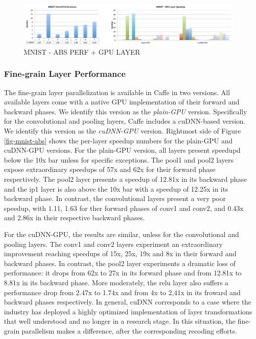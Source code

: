 
\begin{figure}[]
\includegraphics[width=\textwidth]{figures/mnist-abs-perf+gpu-layer.pdf}
\caption{MNIST - ABS PERF + GPU LAYER }
\end{figure}

\subsubsection{Fine-grain Layer Performance}
The fine-grain layer parallelization is available in Caffe in two versions. 
All available layers come with a native GPU implementation of their 
forward and backward phases. We identify this version as the \emph{plain-GPU} 
version. Specifically for the convolutional and pooling layers, Caffe 
includes a cuDNN-based version. We identify this version as the 
\emph{cuDNN-GPU} version. 
Rightmost side of Figure \ref{fig-mnist-abs} shows the per-layer 
speedup numbers for the plain-GPU and cuDNN-GPU versions. 
For the plain-GPU version, all layers present speedupd below 
the 10x bar unless for specific exceptions. The pool1 and pool2 
layers expose extraordinary speedups of 57x and 62x for their 
forward phase respectively. The pool2 layer presents a speedup of 
12.81x in its backward phase and the ip1 layer is also above the 
10x bar with a speedup of 12.25x in its backward phase.
In contrast, the convolutional layers present a very poor speedup, with 
1.11, 1.63 for ther forward phases of conv1 and conv2, and 0.43x and 2.86x 
in their respective backward phases. 

For the cuDNN-GPU, the results are similar, unless for the convolutional 
and pooling layers. The conv1 and conv2 layers experiment an extraordinary 
improvement reaching speedups of 15x, 25x, 19x and 8x in their 
forward and backward phases. In contrast, the pool2 layer experiments a 
dramatic loss of performance: it drops from 62x to 27x in its forward 
phase and from 12.81x to 8.81x in its backward phase. More moderately, 
the relu layer also suffers a performance drop from 2.47x to 1.74x and 
from 4x to 2,41x in its froward and backward phases respectively. 
In general, cuDNN corresponds to a case where the industry has deployed 
a highly optimized implementation of layer transformations that well 
understood and no longer in a research stage. In this situation, the 
fine-grain parallelism makes a difference, after the corresponding recoding 
efforts.

